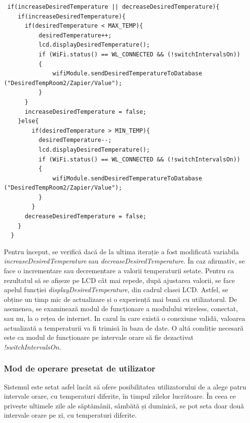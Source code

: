 \begin{lstlisting}
 if(increaseDesiredTemperature || decreaseDesiredTemperature){
    if(increaseDesiredTemperature){
      if(desiredTemperature < MAX_TEMP){
          desiredTemperature++;
          lcd.displayDesiredTemperature();
          if (WiFi.status() == WL_CONNECTED && (!switchIntervalsOn))
          {
              wifiModule.sendDesiredTemperatureToDatabase ("DesiredTempRoom2/Zapier/Value");
          }
      }
      increaseDesiredTemperature = false;
    }else{
        if(desiredTemperature > MIN_TEMP){
          desiredTemperature--;
          lcd.displayDesiredTemperature();
          if (WiFi.status() == WL_CONNECTED && (!switchIntervalsOn))
          {
              wifiModule.sendDesiredTemperatureToDatabase ("DesiredTempRoom2/Zapier/Value");
          }
        }
      decreaseDesiredTemperature = false;
    }
  }
\end{lstlisting}

\vspace{2em}	

	Pentru început, se verifică dacă de la ultima iterație a fost modificată variabila \textit{increaseDesiredTemperature} sau \textit{decreaseDesiredTemperature}. În caz afirmativ, se face o incrementare sau decrementare a valorii temperaturii setate. Pentru ca rezultatul să se afișeze pe LCD cât mai repede, după ajustarea valorii, se face apelul funcției \textit{displayDesiredTemperature}, din cadrul clasei LCD. Astfel, se obține un timp mic de actualizare și o experiență mai bună cu utilizatorul. De asemenea, se examinează modul de funcționare a modulului wireless, conectat, sau nu, la o rețea de internet. In cazul în care există o conexiune validă, valoarea actualizată a temperaturii va fi trimisă în baza de date. O altă condiție necesară este ca modul de funcționare pe intervale orare să fie dezactivat  \textit{!switchIntervalsOn}.

\subsubsection{Mod de operare presetat de utilizator}

	Sistemul este setat asfel încât să ofere posibilitatea utilizatorului de a alege patru intervale orare, cu temperaturi diferite, în timpul zilelor lucrătoare. În ceea ce privește ultimele zile ale săptămânii, sâmbătă și duminică, se pot seta doar două intervale orare pe zi, cu temperaturi diferite.


\vspace{1em}

